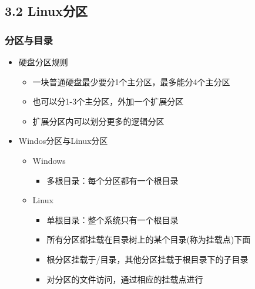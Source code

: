 \documentclass[xcolor=svgnames,presentation]{beamer}
\begin{document}
\subsection{3.2 Linux分区}
\label{sec-3-2}
\begin{frame}
\frametitle{分区与目录}
\label{sec-3-2-1}
\begin{itemize}

\item 硬盘分区规则
\label{sec-3-2-1-1}%
\begin{itemize}

\item 一块普通硬盘最少要分1个主分区，最多能分4个主分区
\label{sec-3-2-1-1-1}%

\item 也可以分1-3个主分区，外加一个扩展分区
\label{sec-3-2-1-1-2}%

\item 扩展分区内可以划分更多的逻辑分区
\label{sec-3-2-1-1-3}%
\end{itemize} %

\item Windos分区与Linux分区
\label{sec-3-2-1-2}%
\begin{itemize}

\item Windows
\label{sec-3-2-1-2-1}%
\begin{itemize}

\item 多根目录：每个分区都有一个根目录
\label{sec-3-2-1-2-1-1}%
\end{itemize} %

\item Linux
\label{sec-3-2-1-2-2}%
\begin{itemize}

\item 单根目录：整个系统只有一个根目录
\label{sec-3-2-1-2-2-1}%

\item 所有分区都挂载在目录树上的某个目录(称为挂载点)下面
\label{sec-3-2-1-2-2-2}%

\item 根分区挂载于/目录，其他分区挂载于根目录下的子目录
\label{sec-3-2-1-2-2-3}%

\item 对分区的文件访问，通过相应的挂载点进行
\label{sec-3-2-1-2-2-4}%
\end{itemize} %
\end{itemize} %
\end{itemize} %
\end{frame}
\end{document}

